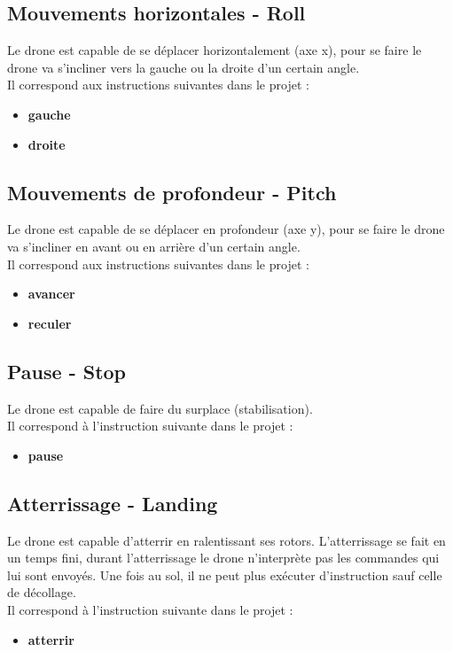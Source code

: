 \documentclass{article}
\begin{document}
    \subsection{Mouvements horizontales - Roll}
        Le drone est capable de se déplacer horizontalement (axe x), pour se faire le drone va s'incliner vers la gauche ou la droite d'un certain angle. \\
        Il correspond aux instructions suivantes dans le projet :
        \begin{itemize}
            \item \textbf{gauche}
            \item \textbf{droite}
        \end{itemize}
    
    \subsection{Mouvements de profondeur - Pitch}
        Le drone est capable de se déplacer en profondeur (axe y), pour se faire le drone va s'incliner en avant ou en arrière d'un certain angle. \\
        Il correspond aux instructions suivantes dans le projet :
        \begin{itemize}
            \item \textbf{avancer}
            \item \textbf{reculer}
        \end{itemize}
        
    \subsection{Pause - Stop}
        Le drone est capable de faire du surplace (stabilisation). \\
        Il correspond à l'instruction suivante dans le projet :
        \begin{itemize}
            \item \textbf{pause}
        \end{itemize}
        
    \subsection{Atterrissage - Landing}
        Le drone est capable d'atterrir en ralentissant ses rotors. L'atterrissage se fait en un temps fini, durant l'atterrissage le drone n'interprète pas les commandes qui lui sont envoyés. Une fois au sol, il ne peut plus exécuter d'instruction sauf celle de décollage. \\
        Il correspond à l'instruction suivante dans le projet :
        \begin{itemize}
            \item \textbf{atterrir}
        \end{itemize}
\end{document}
